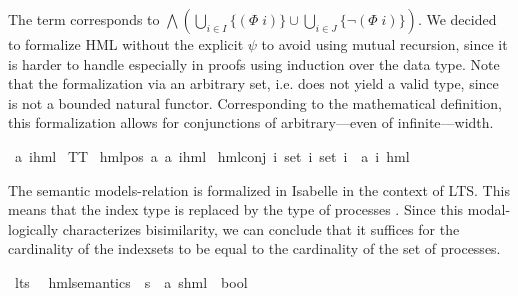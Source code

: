 \begin{isabellebody}
\begin{isamarkuptext}
The term  corresponds to $\bigwedge \left( \bigcup_{i \in I} \{(\Phi\; i)\} \cup \bigcup_{i \in J} \{\lnot (\Phi\; i)\} \right)$.
We decided to formalize HML without the explicit $\psi$ to avoid using mutual recursion, since it is harder to handle especially in proofs using induction over the data type.
Note that the formalization via an arbitrary set, i.e.  does not yield a valid type, since  is not a bounded natural functor.
Corresponding to the mathematical definition, this formalization allows for conjunctions of arbitrary---even of infinite---width.%
\end{isamarkuptext}\isamarkuptrue%
\isamarkupfalse%
\ {\isacharparenleft}{\kern0pt}{\isacharprime}{\kern0pt}a{\isacharcomma}{\kern0pt}\ {\isacharprime}{\kern0pt}i{\isacharparenright}{\kern0pt}hml\ {\isacharequal}{\kern0pt}\isanewline
TT\ {\isacharbar}{\kern0pt}\isanewline
hml{\isacharunderscore}{\kern0pt}pos\ {\isacartoucheopen}{\isacharprime}{\kern0pt}a{\isacartoucheclose}\ {\isacartoucheopen}{\isacharparenleft}{\kern0pt}{\isacharprime}{\kern0pt}a{\isacharcomma}{\kern0pt}\ {\isacharprime}{\kern0pt}i{\isacharparenright}{\kern0pt}hml{\isacartoucheclose}\ {\isacharbar}{\kern0pt}\isanewline
hml{\isacharunderscore}{\kern0pt}conj\ {\isacartoucheopen}{\isacharprime}{\kern0pt}i\ set{\isacartoucheclose}\ {\isacartoucheopen}{\isacharprime}{\kern0pt}i\ set{\isacartoucheclose}\ {\isacartoucheopen}{\isacharprime}{\kern0pt}i\ {\isasymRightarrow}\ {\isacharparenleft}{\kern0pt}{\isacharprime}{\kern0pt}a{\isacharcomma}{\kern0pt}\ {\isacharprime}{\kern0pt}i{\isacharparenright}{\kern0pt}\ hml{\isacartoucheclose}%
\begin{isamarkuptext}%
The semantic models-relation is formalized in Isabelle in the context of LTS. This means that the index type  is replaced by the type of processes . Since this modal-logically characterizes bisimilarity, we can conclude that it suffices for the cardinality of the indexsets to be equal to the cardinality of the set of processes.%
\end{isamarkuptext}\isamarkuptrue%
\isamarkupfalse%
\ lts\ \isanewline
\isanewline
{}\isamarkupfalse%
\ hml{\isacharunderscore}{\kern0pt}semantics\ {\isacharcolon}{\kern0pt}{\isacharcolon}{\kern0pt}\ {\isacartoucheopen}{\isacharprime}{\kern0pt}s\ {\isasymRightarrow}\ {\isacharparenleft}{\kern0pt}{\isacharprime}{\kern0pt}a{\isacharcomma}{\kern0pt}\ {\isacharprime}{\kern0pt}s{\isacharparenright}{\kern0pt}hml\ {\isasymRightarrow}\ bool{\isacartoucheclose}\isanewline

\end{isabellebody}

